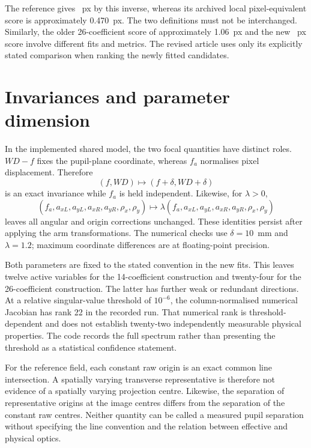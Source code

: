 \documentclass[10pt,a4paper]{article}
\begin{document}
The reference gives \RayPx~px by this inverse, whereas its archived local pixel-equivalent score is approximately 0.470~px. The two definitions must not be interchanged. Similarly, the older 26-coefficient score of approximately 1.06~px and the new \AlignedPx~px score involve different fits and metrics. The revised article uses only its explicitly stated comparison when ranking the newly fitted candidates.

\section{Invariances and parameter dimension}
In the implemented shared model, the two focal quantities have distinct roles. $WD-f$ fixes the pupil-plane coordinate, whereas $f_a$ normalises pixel displacement. Therefore
\begin{equation}
(f,WD)\mapsto(f+\delta,WD+\delta)
\end{equation}
is an exact invariance while $f_a$ is held independent. Likewise, for $\lambda>0$,
\begin{equation}
(f_a,a_{xL},a_{yL},a_{xR},a_{yR},\rho_x,\rho_y)
\mapsto\lambda(f_a,a_{xL},a_{yL},a_{xR},a_{yR},\rho_x,\rho_y)
\end{equation}
leaves all angular and origin corrections unchanged. These identities persist after applying the arm transformations. The numerical checks use $\delta=10$~mm and $\lambda=1.2$; maximum coordinate differences are at floating-point precision.

Both parameters are fixed to the stated convention in the new fits. This leaves twelve active variables for the 14-coefficient construction and twenty-four for the 26-coefficient construction. The latter has further weak or redundant directions. At a relative singular-value threshold of $10^{-6}$, the column-normalised numerical Jacobian has rank 22 in the recorded run. That numerical rank is threshold-dependent and does not establish twenty-two independently measurable physical properties. The code records the full spectrum rather than presenting the threshold as a statistical confidence statement.

For the reference field, each constant raw origin is an exact common line intersection. A spatially varying transverse representative is therefore not evidence of a spatially varying projection centre. Likewise, the separation of representative origins at the image centres differs from the separation of the constant raw centres. Neither quantity can be called a measured pupil separation without specifying the line convention and the relation between effective and physical optics.
\end{document}
